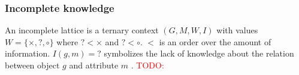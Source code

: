 \subsubsection{Incomplete knowledge}
\label{subsec:incomplete_knowledge}
An incomplete lattice is a ternary context $(G,M,W,I)$ with values $W=\{\times, ?, \circ\}$ where $? < \times$ and $? < \circ$.
$<$ is an order over the amount of information.
$I(g,m)=?$ symbolizes the lack of knowledge about the relation between object $g$ and attribute $m$ \cite{holzer_incompleteFCA_2001}.
\textcolor{red}{TODO: \cite{hille_incomplete_2025,burmeister_treatment_2000}}